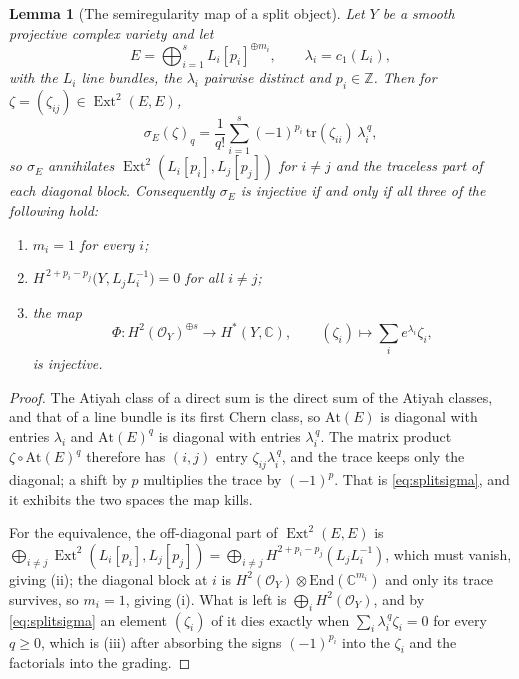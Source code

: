 \documentclass[11pt,reqno]{amsart}
\theoremstyle{plain}
\newtheorem{lemma}[theorem]{Lemma}
\theoremstyle{definition}
\theoremstyle{remark}
\newcommand{\ZZ}{\mathbb{Z}}
\newcommand{\CC}{\mathbb{C}}
\newcommand{\cO}{\mathcal{O}}
\DeclareMathOperator{\Ext}{Ext}
\begin{document}
\begin{lemma}[The semiregularity map of a split object]\label{lem:splitsemireg}
Let $Y$ be a smooth projective complex variety and let
\[
  E=\bigoplus_{i=1}^{s}L_{i}[p_{i}]^{\oplus m_{i}},
  \qquad \lambda_{i}=c_{1}(L_{i}),
\]
with the $L_{i}$ line bundles, the $\lambda_{i}$ pairwise distinct and
$p_{i}\in\ZZ$. Then for $\zeta=(\zeta_{ij})\in\Ext^{2}(E,E)$,
\begin{equation}\label{eq:splitsigma}
  \sigma_{E}(\zeta)_{q}
  =\frac{1}{q!}\sum_{i=1}^{s}(-1)^{p_{i}}\,
    \mathrm{tr}(\zeta_{ii})\,\lambda_{i}^{\,q},
\end{equation}
so $\sigma_{E}$ annihilates $\Ext^{2}(L_{i}[p_{i}],L_{j}[p_{j}])$ for $i\ne j$
and the traceless part of each diagonal block. Consequently $\sigma_{E}$ is
injective if and only if all three of the following hold:
\begin{enumerate}[label=\textup{(\roman*)},nosep]
\item $m_{i}=1$ for every $i$;
\item $H^{\,2+p_{i}-p_{j}}\bigl(Y,L_{j}L_{i}^{-1}\bigr)=0$ for all $i\ne j$;
\item the map
  \[
    \Phi\colon H^{2}(\cO_{Y})^{\oplus s}\longrightarrow H^{*}(Y,\CC),
    \qquad
    (\zeta_{i})\longmapsto\sum_{i}e^{\lambda_{i}}\zeta_{i},
  \]
  is injective.
\end{enumerate}
\end{lemma}

\begin{proof}
The Atiyah class of a direct sum is the direct sum of the Atiyah classes, and
that of a line bundle is its first Chern class, so $\mathrm{At}(E)$ is
diagonal with entries $\lambda_{i}$ and $\mathrm{At}(E)^{q}$ is diagonal with
entries $\lambda_{i}^{\,q}$. The matrix product $\zeta\circ\mathrm{At}(E)^{q}$
therefore has $(i,j)$ entry $\zeta_{ij}\lambda_{i}^{\,q}$, and the trace keeps
only the diagonal; a shift by $p$ multiplies the trace by $(-1)^{p}$. That is
\eqref{eq:splitsigma}, and it exhibits the two spaces the map kills.

For the equivalence, the off-diagonal part of $\Ext^{2}(E,E)$ is
$\bigoplus_{i\ne j}\Ext^{2}(L_{i}[p_{i}],L_{j}[p_{j}])
=\bigoplus_{i\ne j}H^{2+p_{i}-p_{j}}(L_{j}L_{i}^{-1})$, which must vanish,
giving (ii); the diagonal block at $i$ is $H^{2}(\cO_{Y})\otimes
\mathrm{End}(\CC^{m_{i}})$ and only its trace survives, so $m_{i}=1$, giving
(i). What is left is $\bigoplus_{i}H^{2}(\cO_{Y})$, and by
\eqref{eq:splitsigma} an element $(\zeta_{i})$ of it dies exactly when
$\sum_{i}\lambda_{i}^{\,q}\zeta_{i}=0$ for every $q\ge0$, which is (iii) after
absorbing the signs $(-1)^{p_{i}}$ into the $\zeta_{i}$ and the factorials
into the grading.
\end{proof}
\end{document}
